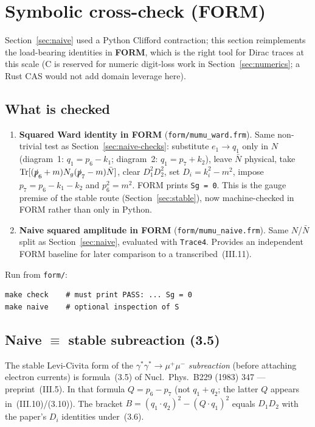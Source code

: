 \documentclass[11pt]{article}
\begin{document}
\section{Symbolic cross-check (FORM)}
\label{sec:symbolic-check}

Section~\ref{sec:naive} used a Python Clifford contraction; this section
reimplements the load-bearing identities in \textbf{FORM}, which is the
right tool for Dirac traces at this scale (C is reserved for numeric
digit-loss work in Section~\ref{sec:numerics}; a Rust CAS would not add
domain leverage here).

\subsection{What is checked}
\label{sec:form-checked}

\begin{enumerate}
  \item \textbf{Squared Ward identity in FORM}
    (\texttt{form/mumu\_ward.frm}).
    Same non-trivial test as Section~\ref{sec:naive-checks}: substitute
    $e_1\to q_1$ only in $N$ (diagram~1: $q_1=p_6-k_1$; diagram~2:
    $q_1=p_7+k_2$), leave $\bar N$ physical, take
    $\mathrm{Tr}[(\slashed p_6+m)N_g(\slashed p_7-m)\bar N]$, clear
    $D_1^2 D_2^2$, set $D_i=k_i^2-m^2$, impose
    $p_7=p_6-k_1-k_2$ and $p_6^2=m^2$. FORM prints
    \texttt{Sg = 0}. This is the gauge premise of the stable route
    (Section~\ref{sec:stable}), now machine-checked in FORM rather than
    only in Python.
  \item \textbf{Naive squared amplitude in FORM}
    (\texttt{form/mumu\_naive.frm}).
    Same $N$/$\bar N$ split as Section~\ref{sec:naive}, evaluated with
    \texttt{Trace4}. Provides an independent FORM baseline for later
    comparison to a transcribed~(III.11).
\end{enumerate}
Run from \texttt{form/}:
\begin{verbatim}
make check    # must print PASS: ... Sg = 0
make naive    # optional inspection of S
\end{verbatim}

\subsection{Naive $\equiv$ stable subreaction (3.5)}
\label{sec:naive-eq-35}

The stable Levi-Civita form of the $\gamma^*\gamma^*\to\mu^+\mu^-$
\emph{subreaction} (before attaching electron currents) is formula~(3.5)
of Nucl.\ Phys.\ B229 (1983) 347 --- preprint~(III.5). In that formula
$Q=p_6-p_7$ (not $q_1+q_2$; the latter $Q$ appears in~(III.10)/(3.10)).
The bracket $B=(q_1{\cdot}q_2)^2-(Q{\cdot}q_1)^2$ equals $D_1 D_2$ with the
paper's $D_i$ identities under~(3.6).
\end{document}
